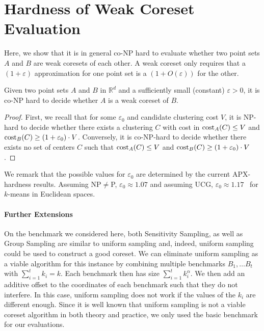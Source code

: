 \section{Hardness of Weak Coreset Evaluation}

Here, we show that it is in general co-NP hard to evaluate whether two point sets $A$ and $B$ are weak coresets of each other. A weak coreset only requires that a $(1+\varepsilon)$ approximation for one point set is a $(1+O(\varepsilon))$ for the other.


\begin{proposition}
\label{prop:hardness}
Given two point sets $A$ and $B$ in $\mathbb{R}^d$ and a sufficiently small (constant) $\varepsilon>0$, it is co-NP hard to decide whether $A$ is a weak coreset of $B$.
\end{proposition}
\begin{proof}
First, we recall that for some $\varepsilon_0$ and candidate clustering cost $V$, it is NP-hard to decide whether there exists a clustering $C$ with cost in $\text{cost}_A(C)\leq V$ and $\text{cost}_B(C)\geq (1+\varepsilon_0)\cdot V$.
Conversely, it is co-NP-hard to decide whether there exists no set of centers $C$ such that $\text{cost}_A(C)\leq V$ and $\text{cost}_B(C) \geq (1+\varepsilon_0)\cdot V$.
\end{proof}

We remark that the possible values for $\varepsilon_0$ are determined by the current APX-hardness results. Assuming NP$\neq$P, $\varepsilon_0\approx 1.07$ and assuming UCG, $\varepsilon_0 \approx 1.17$~\cite{Cohen-AddadSL21,Cohen-AddadS19} for $k$-means in Euclidean spaces.



\paragraph*{Further Extensions}

On the benchmark we considered here, both Sensitivity Sampling, as well as Group Sampling are similar to uniform sampling and, indeed, uniform sampling could be used to construct a good coreset. We can eliminate uniform sampling as a viable algorithm for this instance by combining multiple benchmarks $B_1,\ldots B_t$ with $\sum_{i=1}^t  k_i =k$. Each benchmark then has size $\sum_{i=1}^t  k_i^{\alpha}$. We then add an additive offset to the coordinates of each benchmark such that they do not interfere. In this case, uniform sampling does not work if the values of the $k_i$ are different enough. Since it is well known that uniform sampling is not a viable coreset algorithm in both theory and practice, we only used the basic benchmark for our evaluations.





